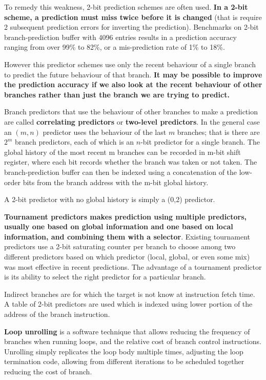 \documentclass[10pt,a4paper]{article}
\begin{document}
To remedy this weakness, 2-bit prediction schemes are often used. \textbf{In a 2-bit scheme, a prediction must miss twice before it is changed} (that is require 2 subsequent prediction errors for inverting the prediction). Benchmarks on 2-bit branch-prediction buffer with 4096 entries results in a prediction accuracy ranging from over 99\% to 82\%, or a mis-prediction rate of 1\% to 18\%.

However this predictor schemes use only the recent behaviour of a single branch to predict the future behaviour of that branch. \textbf{It may be possible to improve the prediction accuracy if we also look at the recent behaviour of other branches rather than just the branch we are trying to predict.}

Branch predictors that use the behaviour of other branches to make a prediction are called \textbf{correlating predictors} or \textbf{two-level predictors}. In the general case an $(m,n)$ predictor uses the behaviour of the last $m$ branches; that is there are $2^m$ branch predictors, each of which is an $n$-bit predictor for a single branch.  The global history of the most recent m branches can be recorded in m-bit shift register, where each bit records whether the branch was taken or not taken. The branch-prediction buffer can then be indexed using a concatenation of the low-order bits from the branch address with the m-bit global history.

A 2-bit predictor with no global history is simply a (0,2) predictor. 

\textbf{Tournament predictors makes prediction using multiple predictors, usually one based on global information and one based on local information, and combining them with a selector}. Existing tournament predictors use a 2-bit saturating counter per branch to choose among two different predictors based on which predictor (local, global, or even some mix) was most effective in recent predictions. The advantage of a tournament predictor is its ability to select the right predictor for a particular branch.

Indirect branches are for which the target is not know at instruction fetch time. A table of 2-bit predictors are used which is indexed using lower portion of the address of the branch instruction.

\textbf{Loop unrolling} is a software technique that allows reducing the frequency of branches when running loops, and the relative cost of branch control instructions. Unrolling simply replicates the loop body multiple times, adjusting the loop termination code, allowing from  different  iterations  to  be  scheduled together reducing the cost of branch.
\end{document}
